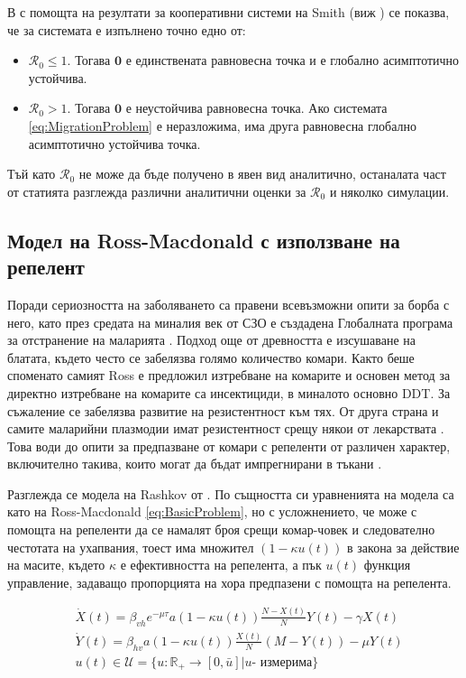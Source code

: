 В \cite{Bichara2016} с помощта на резултати за кооперативни системи на Smith (виж \cite{Smith1986}) се показва, че за системата е изпълнено точно едно от:
\begin{itemize}
  \item $\mathscr{R}_0 \leq 1$. Тогава $\mathbf{0}$ е единствената равновесна точка и е глобално асимптотично устойчива.
  \item $\mathscr{R}_0 > 1$. Тогава $\mathbf{0}$ е неустойчива равновесна точка. Ако системата \eqref{eq:MigrationProblem} е неразложима, има друга равновесна глобално асимптотично устойчива точка.
\end{itemize}

Тъй като $\mathscr{R}_0$ не може да бъде получено в явен вид аналитично, останалата част от статията \cite{Bichara2016} разглежда различни аналитични оценки за $\mathscr{R}_0$ и няколко симулации.

\subsection{Модел на Ross-Macdonald с използване на репелент}
Поради сериозността на заболяването са правени всевъзможни опити за борба с него, като през средата на миналия век от СЗО е създадена Глобалната програма за отстранение на маларията \cite{WHO2017}.
Подход още от древността е изсушаване на блатата, където често се забелязва голямо количество комари.
Както беше споменато самият Ross е предложил изтребване на комарите и основен метод за директно изтребване на комарите са инсектициди, в миналото основно DDT.
За съжаление се забелязва развитие на резистентност към тях.
От друга страна и самите маларийни плазмодии имат резистентност срещу някои от лекарствата \cite[глава~83]{Baron1996}.
Това води до опити за предпазване от комари с репеленти от различен характер, включително такива, които могат да бъдат импрегнирани в тъкани \cite{Grancaric2019}.

Разглежда се модела на Rashkov от \cite{Rashkov2022}.
По същността си уравненията на модела са като на Ross-Macdonald \eqref{eq:BasicProblem}, но с усложнението, че може с помощта на репеленти да се намалят броя срещи комар-човек и следователно честотата на ухапвания, тоест има множител $(1 - \kappa u(t))$ в закона за действие на масите, където $\kappa$ е ефективността на репелента, а пък $u(t)$ функция управление, задаващо пропорцията на хора предпазени с помощта на репелента.

\begin{equation}
  \label{eq:RepellentProblem}
  \begin{split}
    &\dot{X}(t) = \beta_{vh} e^{-\mu \tau} a (1-\kappa u(t)) \frac{N-X(t)}{N} Y(t) - \gamma X(t) \\
    &\dot{Y}(t) = \beta_{hv} a (1-\kappa u(t)) \frac{X(t)}{N} (M-Y(t)) - \mu Y(t) \\
    &u(t) \in \mathscr{U} = \{u:\mathbb{R}_+ \rightarrow [0, \bar{u}] \vert u \text{- измерима}\}
  \end{split}
\end{equation}


